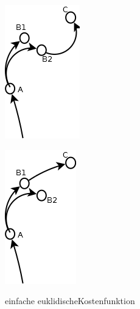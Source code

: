 \begin{figure}[htb]
  \label{fig:fig6}  
    \centering
    \begin{minipage}[t]{0.45\linewidth}
        \centering
        \includegraphics[width=.6\linewidth]{Bilder/B2Insert.png}
        \caption{einfache euklidischeKostenfunktion}
    \end{minipage}%
    \hfill
    \begin{minipage}[t]{0.45\linewidth}
\label{fig:fig7}                 
        \centering
        \includegraphics[width=.6\linewidth]{Bilder/B1Insert.png}

\end{minipage}
\end{figure}
